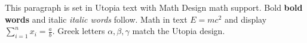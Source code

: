 \documentclass{article}
\begin{document}
This paragraph is set in Utopia text with Math Design math support.
Bold \textbf{bold words} and italic \textit{italic words} follow.
Math in text $E = mc^2$ and display $\sum_{i=1}^{n} x_i = \frac{a}{b}$.
Greek letters $\alpha, \beta, \gamma$ match the Utopia design.
\end{document}
